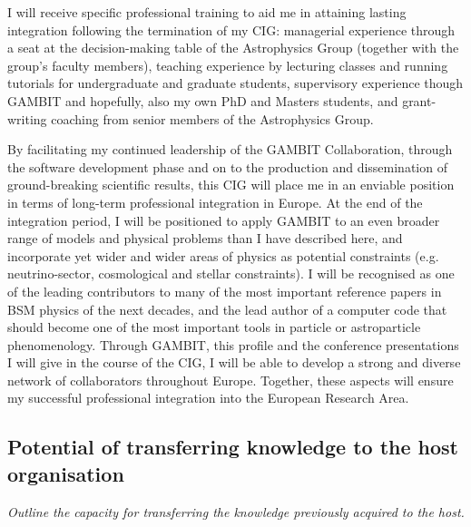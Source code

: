 \documentclass[a4paper,11pt]{article}
\newenvironment{xcomment}{\em}{}
\begin{document}
I will receive specific professional training to aid me in attaining lasting integration following the termination of my CIG: managerial experience through a seat at the decision-making table of the Astrophysics Group (together with the group's faculty members), teaching experience by lecturing classes and running tutorials for undergraduate and graduate students, supervisory experience though GAMBIT and hopefully, also my own PhD and Masters students, and grant-writing coaching from senior members of the Astrophysics Group.

By facilitating my continued leadership of the GAMBIT Collaboration, through the software development phase and on to the production and dissemination of ground-breaking scientific results, this CIG will place me in an enviable position in terms of long-term professional integration in Europe.  At the end of the integration period, I will be positioned to apply GAMBIT to an even broader range of models and physical problems than I have described here, and incorporate yet wider and wider areas of physics as potential constraints (e.g. neutrino-sector, cosmological and stellar constraints).  I will be recognised as one of the leading contributors to many of the most important reference papers in BSM physics of the next decades, and the lead author of a computer code that should become one of the most important tools in particle or astroparticle phenomenology.  Through GAMBIT, this profile and the conference presentations I will give in the course of the CIG, I will be able to develop a strong and diverse network of collaborators throughout Europe.  Together, these aspects will ensure my successful professional integration into the European Research Area.

\subsection{Potential of transferring knowledge to the host organisation}
\begin{xcomment}
Outline the capacity for transferring the knowledge previously
acquired to the host.
\end{xcomment}
\end{document}
